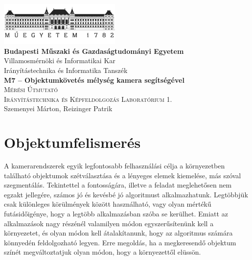 \documentclass[12pt,a4paper,oneside]{report}             %
\author{\vikauthor}
\title{\viktitle}
\newcommand{\vikauthor}{Szemenyei Márton, Reizinger Patrik}
\newcommand{\viktitle}{M7 – Objektumkövetés mélység kamera segítségével}
\newcommand{\vikdept}{Irányítástechnika és Informatika Tanszék}
\newcommand{\vikdoktipus}{Irányítástechnika és Képfeldolgozás Laboratórium 1.}
\newcommand{\viksubtitle}{Mérési Útmutató}
\newcommand{\hsp}{\hspace{20pt}}
\begin{document}
\onehalfspacing

\begin{titlepage}
\begin{center}
\includegraphics[width=60mm,keepaspectratio]{images/logo.png}\\
\vspace{0.3cm}
\textbf{Budapesti Műszaki és Gazdaságtudományi Egyetem}\\
\textmd{Villamosmérnöki és Informatikai Kar}\\
\textmd{\vikdept}\\[5cm]

\vspace{0.4cm}
{\huge \bfseries \viktitle}\\[2cm]
\textsc{\Large \viksubtitle}\\[1cm]
\textsc{\Large \vikdoktipus}\\[6cm]

\vfill
{\large \vikauthor}
\end{center}
\end{titlepage}


\singlespacing
\tableofcontents\thispagestyle{fancy}
\titleformat{\chapter}[hang]{\Huge\bfseries}{\thechapter\hsp}{0pt}{\Huge\bfseries}
\onehalfspacing

\chapter{Objektumfelismerés}

A kamerarendszerek egyik legfontosabb felhasználási célja a környezetben található objektumok szétválasztása és a lényeges elemek kiemelése, más szóval szegmentálás. Tekintettel a fontosságára, illetve a feladat meglehetősen nem egzakt jellegére, számos jó és kevésbé jó algoritmust alkalmazhatunk. Legtöbbjük csak különleges körülmények között használható, vagy olyan mértékű futásidőigénye, hogy a legtöbb alkalmazásban szóba se kerülhet. Emiatt az alkalmazások nagy részénél valamilyen módon egyszerűsítenünk kell a környezetet, és olyan módon kell átalakítanunk, hogy az algoritmus számára könnyedén feldolgozható legyen. Erre megoldás, ha a megkeresendő objektum színét megváltoztatjuk olyan módon, hogy a környezettől elüssön.
\end{document}
